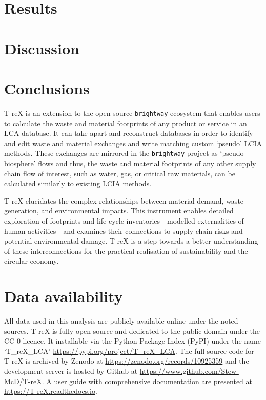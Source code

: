 \documentclass[review,3p,authoryear]{elsarticle}
\renewcommand{\texttt}[1]{{\ttfamily\small\nolinkurl{#1}}}
\begin{document}
\section{Results}\label{sec:results}


\section{Discussion}\label{sec:discussion}


\section{Conclusions}\label{sec:conclusions}

T-reX is an extension to the open-source \texttt{brightway} ecosystem that enables users to calculate the waste and material footprints of any product or service in an LCA database. It can take apart and reconstruct databases in order to identify and edit waste and material exchanges and write matching custom `pseudo' LCIA methods. These exchanges are mirrored in the \texttt{brightway} project as `pseudo-biosphere' flows and thus, the waste and material footprints of any other supply chain flow of interest, such as water, gas, or critical raw materials, can be calculated similarly to existing LCIA methods.

T-reX elucidates the complex relationships between material demand, waste generation, and environmental impacts. This instrument enables detailed exploration of footprints and life cycle inventories---modelled externalities of human activities---and examines their connections to supply chain risks and potential environmental damage. T-reX is a step towards a better understanding of these interconnections for the practical realisation of sustainability and the circular economy.

\section*{Data availability}
All data used in this analysis are publicly available online under the noted sources. T-reX is fully open source and dedicated to the public domain under the CC-0 licence. It installable via the Python Package Index (PyPI) under the name `T\_reX\_LCA' \url{https://pypi.org/project/T_reX_LCA}.
The full source code for T-reX is archived by Zenodo at \url{https://zenodo.org/records/10925359} and the development server is hosted by Github at \url{https://www.github.com/Stew-McD/T-reX}. A user guide with comprehensive documentation are presented at \url{https://T-reX.readthedocs.io}.
\end{document}
